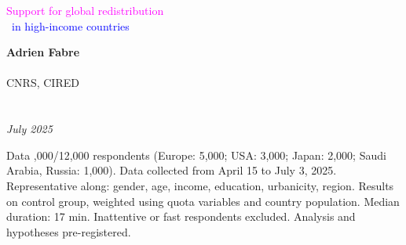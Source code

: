 \documentclass[aspectratio=169,xcolor=dvipsnames, 11pt,mathserif]{beamer}
\begin{document}

\begin{frame}
\thispagestyle{empty}
\begin{center}
\begin{LARGE}
\textcolor{magenta}{Support for global redistribution}\\~\textcolor{blue}{in high-income countries} \end{LARGE}
\vspace{1cm}

\textbf{Adrien Fabre} \\ \quad \\
CNRS, CIRED \\ \quad \\ \quad \\
\textit{July 2025} 
\end{center}
\bigskip
\end{frame}


\begin{frame}{Data}
  \vspace{.1cm}
\bbvs
{},000/12,000 respondents (Europe: 5,000; USA: 3,000; Japan: 2,000; Saudi Arabia, Russia: 1,000).
\ip Data collected from April 15 to July 3, 2025.
\ip Representative along: gender, age, income, education, urbanicity, region.
\ip Results on control group, weighted using quota variables and country population.
\ip Median duration: 17 min. Inattentive or fast respondents excluded.
\ip Analysis and hypotheses pre-registered.
\ee
\end{frame}

\end{document}
